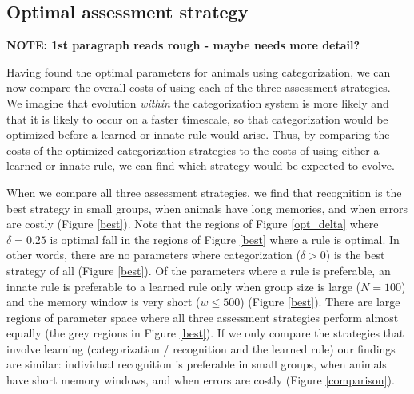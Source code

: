 
\subsection*{Optimal assessment strategy}
\textbf{NOTE: 1st paragraph reads rough - maybe needs more detail?} %

Having found the optimal parameters for animals using categorization, we can now compare the overall costs of using each of the three assessment strategies. We imagine that evolution \emph{within} the categorization system is more likely and that it is likely to occur on a faster timescale, so that categorization would be optimized before a learned or innate rule would arise.  Thus, by comparing the costs of the optimized categorization strategies to the costs of using either a learned or innate rule, we can find which strategy would be expected to evolve.

When we compare all three assessment strategies, we find that recognition is the best strategy in small groups, when animals have long memories, and when errors are costly (Figure \ref{best}). Note that the regions of Figure \ref{opt_delta} where $\delta=0.25$ is optimal fall in the regions of Figure \ref{best} where a rule is optimal. In other words, there are no parameters where categorization ($\delta>0$) is the best strategy of all (Figure \ref{best}).  Of the parameters where a rule is preferable, an innate rule is preferable to a learned rule only when group size is large ($N=100$) and the memory window is very short ($w\leq500$) (Figure \ref{best}). There are large regions of parameter space where all three assessment strategies perform almost equally (the grey regions in Figure \ref{best}). If we only compare the strategies that involve learning (categorization / recognition and the learned rule) our findings are similar: individual recognition is preferable in small groups, when animals have short memory windows, and when errors are costly (Figure \ref{comparison}).

